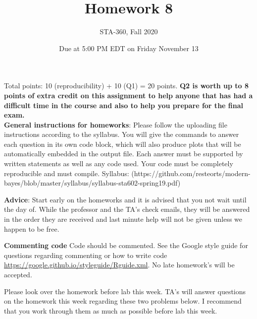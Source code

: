 \documentclass{article}
\begin{document}
\title{Homework 8}
\author{STA-360, Fall 2020}
\date{Due at 5:00 PM EDT on Friday November 13}
\maketitle

Total points: 10 (reproducibility) + 10 (Q1) = 20 points. \textbf{Q2 is worth up to 8 points of extra credit on this assignment to help anyone that has had a difficult time in the course and also to help you prepare for the final exam.} \\

\textbf{General instructions for homeworks}: Please follow the uploading file instructions according to the syllabus. You will give the commands to answer each question in its own code block, which will also produce plots that will be automatically embedded in the output file. Each answer must be supported by written statements as well as any code used. Your code must be completely reproducible and must compile. Syllabus: (https://github.com/resteorts/modern-bayes/blob/master/syllabus/syllabus-sta602-spring19.pdf)

\textbf{Advice}: Start early on the homeworks and it is advised that you not wait until the day of. While the professor and the TA's check emails, they will be answered in the order they are received and last minute help will not be given unless we happen to be free.  

\textbf{Commenting code}
Code should be commented. See the Google style guide for questions regarding commenting or how to write 
code \url{https://google.github.io/styleguide/Rguide.xml}. No late homework's will be accepted.

Please look over the homework before lab this week. TA's will answer questions on the homework this week regarding these two 
problems below. I recommend that you work through them as much as possible before lab this week. 
\end{document}

